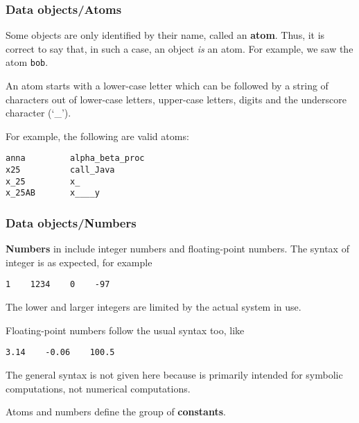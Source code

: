 
%
\begin{frame}[containsverbatim]
\frametitle{Data objects/Atoms}

Some objects are only identified by their name, called an
\textbf{atom}. Thus, it is correct to say that, in such a case, an
object \emph{is} an atom. For example, we saw the atom \texttt{bob}.

\bigskip

An atom starts with a lower-case letter which can be followed by a
string of characters out of lower-case letters, upper-case letters,
digits and the underscore character (`\_').

\bigskip

For example, the following are valid atoms:
{\small
\begin{verbatim}
anna         alpha_beta_proc
x25          call_Java
x_25         x_
x_25AB       x____y
\end{verbatim}
}

\end{frame}

%
\begin{frame}[containsverbatim]
\frametitle{Data objects/Numbers}

\textbf{Numbers} in \Prolog include integer numbers and floating-point
numbers. The syntax of integer is as expected, for example
{\small
\begin{verbatim}
1    1234    0    -97
\end{verbatim}
}
The lower and larger integers are limited by the actual \Prolog system
in use.

\bigskip

Floating-point numbers follow the usual syntax too, like
{\small
\begin{verbatim}
3.14    -0.06    100.5
\end{verbatim}
}
The general syntax is not given here because \Prolog is primarily
intended for symbolic computations, not numerical computations.

\bigskip

Atoms and numbers define the group of \textbf{constants}.

\end{frame}

